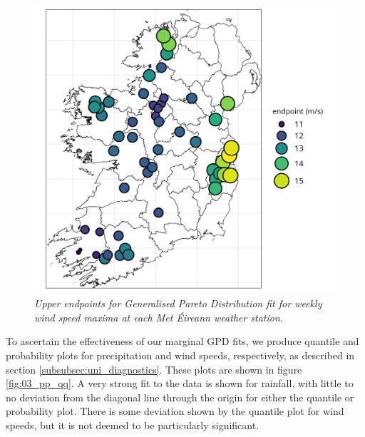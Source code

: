 \documentclass{article}
\numberwithin{equation}{section}
\begin{document}
\begin{figure}[H]
    \centering
    \includegraphics[width = 0.9\linewidth]{plots/034_ws_endpoint.png}
    \caption{\emph{Upper endpoints for Generalised Pareto Distribution fit for weekly wind speed maxima at each Met Éireann weather station.}}
    \label{fig:03_ws_endpoint}
\end{figure}


To ascertain the effectiveness of our marginal GPD fits, we produce quantile and probability plots for precipitation and wind speeds, respectively, as described in section \ref{subsubsec:uni_diagnostics}.
These plots are shown in figure \ref{fig:03_pp_qq}.
A very strong fit to the data is shown for rainfall, with little to no deviation from the diagonal line through the origin for either the quantile or probability plot.
There is some deviation shown by the quantile plot for wind speeds, but it is not deemed to be particularly significant.
\end{document}
